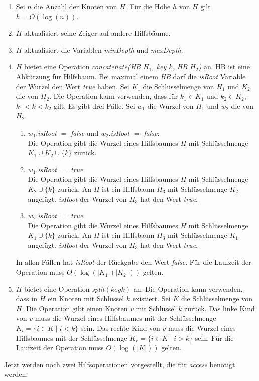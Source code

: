\documentclass[a4paper,12pt]{article}
\begin{document}
\begin{enumerate}
	\item Sei $n$ die Anzahl der Knoten von $H$. Für die Höhe $h$ von $H$ gilt \mbox{$h = O\left(\log \left(n\right)\right)$}.
	\item $H$ aktualisiert seine Zeiger auf andere Hilfsbäume.
	\item $H$ aktualisiert die Variablen  \textit{minDepth} und \textit{maxDepth}.
	\item $H$ bietet eine Operation \textit{concatenate(HB $H_1$, key $k$, HB  $H_2$)} an. HB ist eine Abkürzung für Hilfsbaum. Bei maximal einem \textit{HB}  darf die \textit{isRoot} Variable der Wurzel den Wert \textit{true} haben. Sei $K_1$ die Schlüsselmenge von $H_1$ und $K_2$ die von $H_2$. Die Operation kann verwenden, dass für $k_1 \in K_1$ und $k_2 \in K_2$, $k_1 < k < k_2$ gilt. Es gibt drei Fälle. Sei $w_1$ die Wurzel von $H_1$ und $w_2$ die von $H_2$.
	\begin{enumerate}
		\item $w_1$.\textit{isRoot} $=$ \textit{false} und $w_2$.\textit{isRoot} $=$ \textit{false}:\\
		Die Operation gibt die Wurzel eines Hilfsbaumes $H$ mit Schlüsselmenge $K_1 \cup K_2 \cup \{k\} $ zurück.
		\item $w_1$.\textit{isRoot} $=$ \textit{true}:\\	
		Die Operation gibt die Wurzel eines Hilfsbaumes $H$ mit Schlüsselmenge $K_2 \cup \{k\} $ zurück. An $H$ ist ein Hilfsbaum $H_3$ mit Schlüsselmenge $K_2$ angefügt. \textit{isRoot} der Wurzel von $H_3$ hat den Wert \textit{true}.
		\item $w_2$.\textit{isRoot} $=$ \textit{true}:\\	
		Die Operation gibt die Wurzel eines Hilfsbaumes $H$ mit Schlüsselmenge $K_1 \cup \{k\} $ zurück. An $H$ ist ein Hilfsbaum $H_3$ mit Schlüsselmenge $K_1$ angefügt. \textit{isRoot} der Wurzel von $H_3$ hat den Wert \textit{true}.	 
	\end{enumerate}
	In allen Fällen hat \textit{isRoot} der Rückgabe den Wert \textit{false}.
	Für die Laufzeit der Operation muss $O\left(\log \left(\vert K_1 \vert + \vert K_2 \vert\right)\right)$ gelten.
	\item $H$ bietet eine Operation \textit{split}$(\mathit{key }k)$ an. Die Operation kann verwenden, dass in $H$ ein Knoten mit Schlüssel $k$ existiert. Sei $K$ die Schlüsselmenge von $H$. Die Operation gibt einen Knoten $v$ mit Schlüssel $k$ zurück. Das linke Kind von $v$ muss die Wurzel eines Hilfsbaumes mit der Schlüsselmenge ${K_l=\{i\in K \mid  i <k\}}$ sein. Das rechte Kind von $v$ muss die Wurzel eines Hilfsbaumes mit der Schlüsselmenge ${K_r=\{i\in K \mid  i > k\}}$ sein. Für die Laufzeit der Operation muss $O\left(\log \left(\vert K \vert\right) \right)$ gelten.
\end{enumerate} 
Jetzt werden noch zwei Hilfsoperationen vorgestellt, die für \textit{access} benötigt werden.\\
\end{document}

